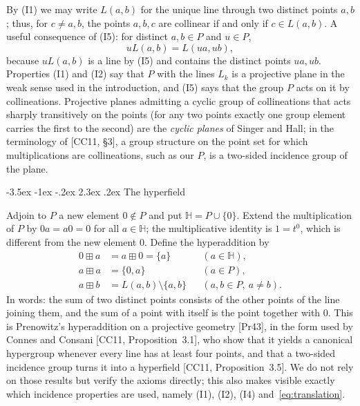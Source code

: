 \documentclass[11pt]{article}
\makeatletter
\renewcommand\section{\@startsection{section}{1}{\z@}
  {-3.5ex \@plus -1ex \@minus -.2ex}
  {2.3ex \@plus.2ex}
  {\normalfont\bfseries}}
\theoremstyle{plain}
\theoremstyle{definition}
\newcommand{\Hh}{\mathbb{H}}
\newcommand{\bp}{\boxplus}
\makeatother
\begin{document}
By (I1) we may write $L(a,b)$ for the unique line through two distinct
points $a,b$; thus, for $c\neq a,b$, the points $a,b,c$ are collinear if
and only if $c\in L(a,b)$.  A useful consequence of (I5): for distinct
$a,b\in P$ and $u\in P$,
\begin{equation}\label{eq:translation}
 uL(a,b)=L(ua,ub),
\end{equation}
because $uL(a,b)$ is a line by (I5) and contains the distinct points
$ua,ub$.  Properties (I1) and (I2) say that $P$ with the lines $L_k$ is
a projective plane in the weak sense used in the introduction, and (I5)
says that the group $P$ acts on it by collineations.  Projective planes admitting a
cyclic group of collineations that acts sharply transitively on the
points (for any two points exactly one group element carries the first
to the second) are the \emph{cyclic planes} of Singer and Hall; in the
terminology of [CC11, \S3], a group structure on the point set for
which multiplications are collineations, such as our $P$, is a
two-sided incidence group of the plane.

\section{The hyperfield}\label{sec:hyperfield}

Adjoin to $P$ a new element $0\notin P$ and put $\Hh=P\cup\{0\}$.
Extend the multiplication of $P$ by $0a=a0=0$ for all $a\in\Hh$; the
multiplicative identity is $1=t^0$, which is different from the new
element $0$.  Define the hyperaddition by
\begin{equation}\label{eq:addition}
 \begin{aligned}
 0\bp a&=a\bp0=\{a\} &&(a\in\Hh),\\
 a\bp a&=\{0,a\} &&(a\in P),\\
 a\bp b&=L(a,b)\setminus\{a,b\}
       &&(a,b\in P,\ a\neq b).
 \end{aligned}
\end{equation}
In words: the sum of two distinct points consists of the other points of
the line joining them, and the sum of a point with itself is the point
together with $0$.  This is Prenowitz's hyperaddition on a projective
geometry [Pr43], in the form used by Connes and Consani
[CC11, Proposition~3.1], who show that it yields a canonical hypergroup
whenever every line has at least four points, and that a two-sided
incidence group turns it into a hyperfield [CC11, Proposition~3.5].  We
do not rely on those results but verify the axioms directly; this also
makes visible exactly which incidence properties are used, namely
(I1), (I2), (I4) and~\eqref{eq:translation}.
\end{document}
